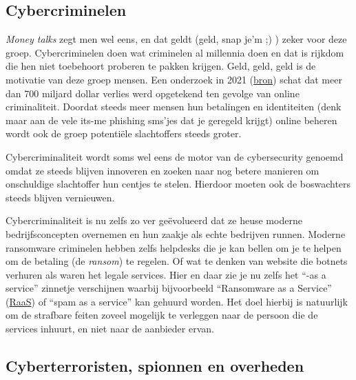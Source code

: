 \documentclass[
  10pt,
  dutch,
  paper=a4,
  ,captions=tableheading
]{scrbook}
\begin{document}
\subsection{Cybercriminelen}\label{cybercriminelen}

\emph{Money talks} zegt men wel eens, en dat geldt (geld, snap je'm ;) )
zeker voor deze groep. Cybercriminelen doen wat criminelen al millennia
doen en dat is rijkdom die hen niet toebehoort proberen te pakken
krijgen. Geld, geld, geld is de motivatie van deze groep mensen. Een
onderzoek in 2021
(\href{https://www.iii.org/fact-statistic/facts-statistics-identity-theft-and-cybercrime\#:~:text=There\%20were\%204.8\%20million\%20identity,up\%20from\%20651\%2C000\%20in\%202019.}{bron})
schat dat meer dan 700 miljard dollar verlies werd opgetekend ten
gevolge van online criminaliteit. Doordat steeds meer mensen hun
betalingen en identiteiten (denk maar aan de vele its-me phishing
sms'jes dat je geregeld krijgt) online beheren wordt ook de groep
potentiële slachtoffers steeds groter.

Cybercriminaliteit wordt soms wel eens de motor van de cybersecurity
genoemd omdat ze steeds blijven innoveren en zoeken naar nog betere
manieren om onschuldige slachtoffer hun centjes te stelen. Hierdoor
moeten ook de boswachters steeds blijven vernieuwen.

Cybercriminaliteit is nu zelfs zo ver geëvolueerd dat ze heuse moderne
bedrijfsconcepten overnemen en hun zaakje als echte bedrijven runnen.
Moderne ransomware criminelen hebben zelfs helpdesks die je kan bellen
om je te helpen om de betaling (de \emph{ransom}) te regelen. Of wat te
denken van website die botnets verhuren als waren het legale services.
Hier en daar zie je nu zelfs het ``-as a service'' zinnetje verschijnen
waarbij bijvoorbeeld ``Ransomware as a Service''
(\href{https://zvelo.com/raas-ransomware-as-a-service/}{RaaS}) of ``spam
as a service'' kan gehuurd worden. Het doel hierbij is natuurlijk om de
strafbare feiten zoveel mogelijk te verleggen naar de persoon die de
services inhuurt, en niet naar de aanbieder ervan.

\subsection{Cyberterroristen, spionnen en
overheden}\label{cyberterroristen-spionnen-en-overheden}
\end{document}
